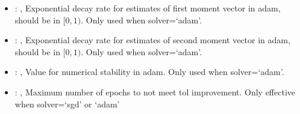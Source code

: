 \begin{itemize}
    \item {}: , 
      Exponential decay rate for estimates of first moment vector in adam, should be in $[0, 1)$.
      Only used when solver=`adam'.

    \item {}: , 
      Exponential decay rate for estimates of second moment vector in adam, should be in $[0, 1)$.
      Only used when solver=`adam'.

    \item {}: , 
      Value for numerical stability in adam. Only used when solver=`adam'.

    \item {}: , 
      Maximum number of epochs to not meet tol improvement. Only effective when
      solver=`sgd' or `adam'
  \end{itemize}


